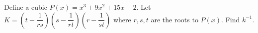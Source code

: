 Define a cubic $P(x) = x^3 + 9x^2 + 15x - 2$. Let $K = (t - \dfrac{1}{rs} )(s - \dfrac{1}{rt} )(r - \dfrac{1}{st} )$ where $r, s, t$ are the roots to $P(x)$. Find $k^{-1}$.
